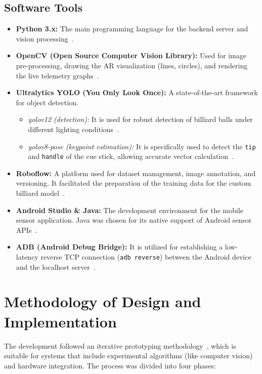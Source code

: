\subsection{Software Tools}
\begin{itemize}
    \item \textbf{Python 3.x:} The main programming language for the backend server and vision processing~\cite{bib:python}.
    \item \textbf{OpenCV (Open Source Computer Vision Library):} Used for image pre-processing, drawing the AR visualization (lines, circles), and rendering the live telemetry graphs~\cite{bib:opencv-library}.
    \item \textbf{Ultralytics YOLO (You Only Look Once):} A state-of-the-art framework for object detection.
    \begin{itemize}
        \item \textit{yolov12 (detection):} It is used for robust detection of billiard balls under different lighting conditions~\cite{bib:yolo12}.
        \item \textit{yolov8-pose (keypoint estimation):} It is specifically used to detect the \texttt{tip} and \texttt{handle} of the cue stick, allowing accurate vector calculation~\cite{bib:yolov8-ultralytics}.
    \end{itemize}
    \item \textbf{Roboflow:} A platform used for dataset management, image annotation, and versioning. It facilitated the preparation of the training data for the custom billiard model~\cite{bib:roboflow}.
    \item \textbf{Android Studio \& Java:} The development environment for the mobile sensor application. Java was chosen for its native support of Android sensor APIs~\cite{bib:android}.
    \item \textbf{ADB (Android Debug Bridge):} It is utilized for establishing a low-latency reverse TCP connection (\texttt{adb reverse}) between the Android device and the localhost server~\cite{bib:adb}.
\end{itemize}

\section{Methodology of Design and Implementation}

The development followed an iterative prototyping methodology~\cite{bib:method}, which is suitable for systems that include experimental algorithms (like computer vision) and hardware integration. The process was divided into four phases:

